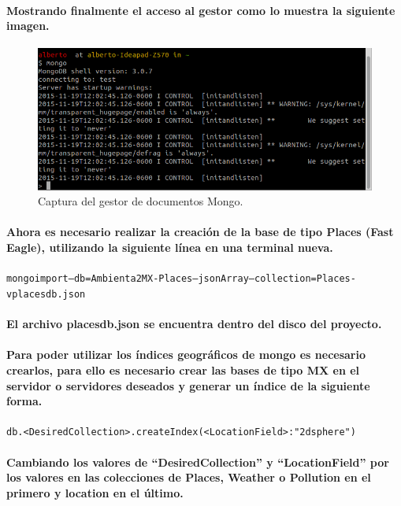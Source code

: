 	\paragraph{Mostrando finalmente el acceso al gestor como lo muestra la siguiente imagen.}
	\begin{figure}[h!]
    	\centering
    		\includegraphics[width=\textwidth]{./images/TerminalMongo}
    		\caption{Captura del gestor de documentos Mongo.}
  	\end{figure}
  \paragraph{Ahora es necesario realizar la creación de la base de tipo Places (Fast Eagle), utilizando la siguiente línea en una terminal nueva.}
  \begin{alltt}
    mongoimport --db=Ambienta2MX-Places --jsonArray --collection=Places -v placesdb.json
  \end{alltt}
  \paragraph{El archivo placesdb.json se encuentra dentro del disco del proyecto.}
  \paragraph{Para poder utilizar los índices geográficos de mongo es necesario crearlos, para ello es necesario crear las bases de tipo MX en el servidor o servidores deseados y generar un índice de la siguiente forma.}
  \begin{alltt}
    db.<DesiredCollection>.createIndex( { <LocationField> : "2dsphere" } )
  \end{alltt}
  \paragraph{Cambiando los valores de ``DesiredCollection'' y ``LocationField'' por los valores en las colecciones de Places, Weather o Pollution en el primero y location en el último.}
